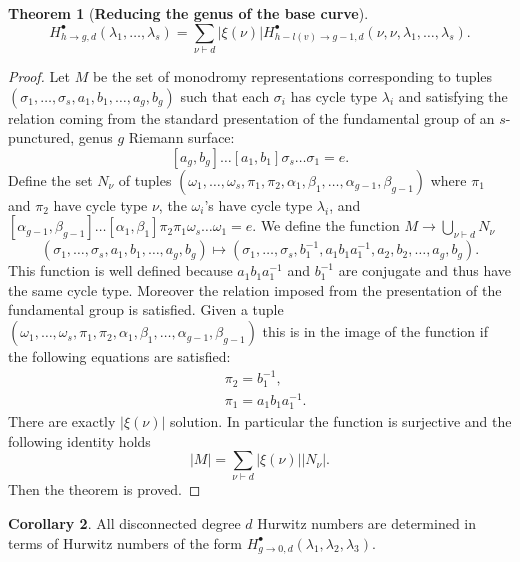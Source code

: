 \documentclass[12pt,a4paper,openright,twoside]{report}
\theoremstyle{definition} %
\newtheorem{theorem}{Theorem}[chapter]
\newtheorem{corollary}[theorem]{Corollary}
\begin{document}
\begin{theorem}[\textbf{Reducing the genus of the base curve}]
    \[
    H_{h \to g , d}^{\bullet}(\lambda_1, \ldots, \lambda_s) =
    \sum_{\nu \vdash d} |\xi(\nu)| H_{h-l(v) \to g-1 , d}^{\bullet}(\nu,\nu, \lambda_1, \ldots, \lambda_s).
    \]
\end{theorem}

\begin{proof}
     Let \(M\) be the set of monodromy representations corresponding to tuples\\ \((\sigma_1, \ldots, \sigma_s,a_1,b_1, \ldots,a_g,b_g)\) such that each \(\sigma_i\) has cycle type \(\lambda_i\) and satisfying the relation coming from the standard presentation of the fundamental group of an \(s\)-punctured, genus \(g\) Riemann surface:
    \[
    [a_g, b_g] \ldots [a_1,b_1]\sigma_s \ldots \sigma_1 = e.
    \]
    Define the set \(N_{\nu}\) of tuples \((\omega_1, \ldots, \omega_s,\pi_1,\pi_2,\alpha_1,\beta_1, \ldots,\alpha_{g-1},\beta_{g-1})\) where \(\pi_1\) and \(\pi_2\) have cycle type \(\nu\), the \(\omega_i\)'s have cycle type \(\lambda_i\), and \([\alpha_{g-1}, \beta_{g-1}] \ldots [\alpha_1,\beta_1] \pi_2 \pi_1 \omega_s \ldots \omega_1  = e\).
    We define the function \(M \to \bigcup_{\nu \vdash d} N_{\nu}\)
    \[
    (\sigma_1, \ldots, \sigma_s,a_1,b_1, \ldots,a_{g},b_{g}) \mapsto
    (\sigma_1, \ldots, \sigma_s,b_1^{-1},a_1 b_1 a_1^{-1},a_2,b_2,\ldots,a_{g},b_{g}).
    \]
    This function is well defined because \(a_1 b_1 a_1^{-1}\) and \(b_1^{-1}\) are conjugate and thus have the same cycle type. Moreover the relation imposed from the presentation of the fundamental group is satisfied.
    Given a tuple \((\omega_1, \ldots, \omega_s,\pi_1,\pi_2,\alpha_1,\beta_1, \ldots,\alpha_{g-1},\beta_{g-1})\) this is in the image of the function if the following equations are satisfied:
    \begin{align*}
        &\pi_2 = b_1^{-1},\\
        &\pi_1 = a_1 b_1 a_1^{-1} .
    \end{align*}
    There are exactly \(|\xi(\nu)|\) solution. In particular the function is surjective and the following identity holds
    \[
        |M| = \sum_{\nu \vdash d} |\xi(\nu)| |N_{\nu}|.
    \]
    Then the theorem is proved.
\end{proof}

\begin{corollary}
    All disconnected degree \(d\) Hurwitz numbers are determined in terms of Hurwitz numbers of the form \(H_{g \to 0 , d}^{\bullet}(\lambda_1,\lambda_2,\lambda_3)\).
 \end{corollary}
\end{document}
